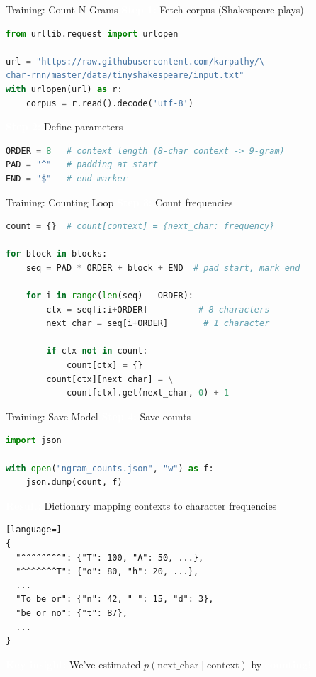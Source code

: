 \documentclass[aspectratio=169]{beamer}
\renewcommand{\textbf}[1]{\textcolor{white}{\bfseries #1}}
\begin{document}
\begin{frame}[fragile]{Training: Count N-Grams}
\textbf{Step 1:} Fetch corpus (Shakespeare plays)

\begin{lstlisting}[language=Python]
from urllib.request import urlopen

url = "https://raw.githubusercontent.com/karpathy/\
char-rnn/master/data/tinyshakespeare/input.txt"
with urlopen(url) as r:
    corpus = r.read().decode('utf-8')
\end{lstlisting}

\vspace{1em}
\textbf{Step 2:} Define parameters

\begin{lstlisting}[language=Python]
ORDER = 8   # context length (8-char context -> 9-gram)
PAD = "^"   # padding at start
END = "$"   # end marker
\end{lstlisting}
\end{frame}

\begin{frame}[fragile,shrink=5]{Training: Counting Loop}
\textbf{Step 3:} Count frequencies

\begin{lstlisting}[language=Python]
count = {}  # count[context] = {next_char: frequency}

for block in blocks:
    seq = PAD * ORDER + block + END  # pad start, mark end
    
    for i in range(len(seq) - ORDER):
        ctx = seq[i:i+ORDER]          # 8 characters
        next_char = seq[i+ORDER]       # 1 character
        
        if ctx not in count:
            count[ctx] = {}
        count[ctx][next_char] = \
            count[ctx].get(next_char, 0) + 1
\end{lstlisting}
\end{frame}


\begin{frame}[fragile]{Training: Save Model}
\textbf{Step 4:} Save counts

\begin{lstlisting}[language=Python]
import json

with open("ngram_counts.json", "w") as f:
    json.dump(count, f)
\end{lstlisting}

\vspace{0.5em}
\textbf{Result:} Dictionary mapping contexts to character frequencies
\begin{lstlisting}[language=]
{
  "^^^^^^^^": {"T": 100, "A": 50, ...},
  "^^^^^^^T": {"o": 80, "h": 20, ...},
  ...
  "To be or": {"n": 42, " ": 15, "d": 3},
  "be or no": {"t": 87},
  ...
}
\end{lstlisting}
\vspace{1em}
\textbf{Key insight:} We've estimated $p(\text{next\_char} \mid \text{context})$ by \textbf{counting!}
\end{frame}
\end{document}
